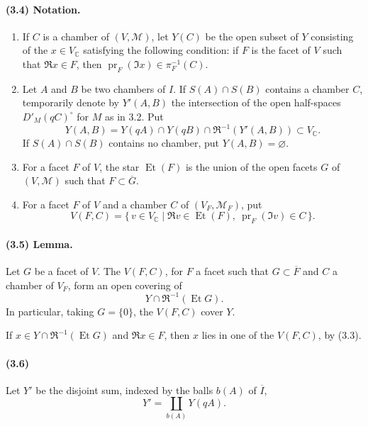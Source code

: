 \documentclass[10pt]{article}
\newcommand{\C}{\mathbb C}
\begin{document}
\paragraph{(3.4) Notation.}
\begin{enumerate}[label=(\roman*)]
\item If \(C\) is a chamber of \((V,\mathcal M)\), let \(Y(C)\) be the open subset of \(Y\) consisting of the \(x\in V_\C\) satisfying the following condition: if \(F\) is the facet of \(V\) such that \(\Re x\in F\), then \(\operatorname{pr}_F(\Im x)\in\pi_F^{-1}(C)\).
\item Let \(A\) and \(B\) be two chambers of \(I\). If \(S(A)\cap S(B)\) contains a chamber \(C\), temporarily denote by \(Y'(A,B)\) the intersection of the open half-spaces \(D'_M(qC)^\circ\) for \(M\) as in 3.2. Put
\[
Y(A,B)=Y(qA)\cap Y(qB)\cap \Re^{-1}(Y'(A,B))\subset V_\C.
\]
If \(S(A)\cap S(B)\) contains no chamber, put \(Y(A,B)=\varnothing\).
\item For a facet \(F\) of \(V\), the star \(\operatorname{Et}(F)\) is the union of the open facets \(G\) of \((V,\mathcal M)\) such that \(F\subset\overline G\).
\item For a facet \(F\) of \(V\) and a chamber \(C\) of \((V_F,\mathcal M_F)\), put
\[
V(F,C)=\{\,v\in V_\C\mid \Re v\in\operatorname{Et}(F),\ \operatorname{pr}_F(\Im v)\in C\,\}.
\]
\end{enumerate}

\paragraph{(3.5) Lemma.} Let \(G\) be a facet of \(V\). The \(V(F,C)\), for \(F\) a facet such that \(G\subset\overline F\) and \(C\) a chamber of \(V_F\), form an open covering of
\[
Y\cap \Re^{-1}(\operatorname{Et}G).
\]
In particular, taking \(G=\{0\}\), the \(V(F,C)\) cover \(Y\).

If \(x\in Y\cap\Re^{-1}(\operatorname{Et}G)\) and \(\Re x\in F\), then \(x\) lies in one of the \(V(F,C)\), by (3.3).

\paragraph{(3.6)} Let \(Y'\) be the disjoint sum, indexed by the balls \(b(A)\) of \(\overline I\),
\[
Y'=\coprod_{b(A)}Y(qA).
\]
\end{document}
